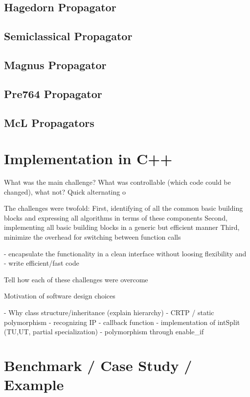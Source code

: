 \subsection{Hagedorn Propagator}
\subsection{Semiclassical Propagator}
\subsection{Magnus Propagator}
\subsection{Pre764 Propagator}
\subsection{McL Propagators}



\clearpage
\section{Implementation in C++}

What was the main challenge? What was controllable (which code could be changed), what not? 
Quick alternating o

The challenges were twofold: 
First, identifying of all the common basic building blocks and expressing all algorithms in terms of these components
Second, implementing all basic building blocks in a generic but efficient manner
Third, minimize the overhead for switching between function calls

 - encapsulate the functionality in a clean interface without loosing flexibility and 
 - write efficient/fast code

Tell how each of these challenges were overcome


Motivation of software design choices

	- Why class structure/inheritance (explain hierarchy)
	- CRTP / static polymorphism
	- recognizing IP
	- callback function
	- implementation of intSplit (TU,UT, partial specialization)
	- polymorphism through enable_if




\clearpage
\section{Benchmark / Case Study / Example}


